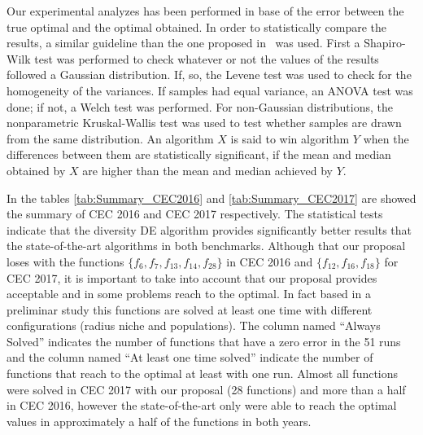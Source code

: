 Our experimental analyzes has been performed in base of the error between the true optimal and the optimal obtained.
%
In order to statistically compare the results, a similar guideline than the one proposed in~\cite{Joel:StatisticalTest} was used. 
%
First a Shapiro-Wilk test was performed to check whatever or not the values of the results followed a Gaussian distribution. 
%
If, so, the Levene test was used to check for the homogeneity of the variances. 
%
If samples had equal variance, an ANOVA test was done; if not, a Welch test was performed. 
%
For non-Gaussian distributions, the nonparametric Kruskal-Wallis test was used to test whether samples are drawn from the same distribution. 
%
An algorithm $X$ is said to win algorithm $Y$ when the differences between them are statistically significant, if the mean and median obtained by $X$ are higher than the mean and median achieved by $Y$.

In the tables \ref{tab:Summary_CEC2016} and \ref{tab:Summary_CEC2017} are showed the summary of CEC 2016 and CEC 2017 respectively.
%
The statistical tests indicate that the diversity DE algorithm provides significantly better results that the state-of-the-art algorithms in both benchmarks.
%
Although that our proposal loses with the functions $\{f_6, f_7, f_{13}, f_{14}, f_{28}\}$ in CEC 2016 and $\{ f_{12}, f_{16}, f_{18} \}$ for CEC 2017, it is important to take into account that our proposal provides acceptable and in some problems reach to the optimal.
%
In fact based in a preliminar study this functions are solved at least one time with different configurations (radius niche and populations).
%
The column named ``Always Solved'' indicates the number of functions that have a zero error in the 51 runs and the column named ``At least one time solved'' indicate the number of functions that reach to the optimal at least with one run.
%
Almost all functions were solved in CEC 2017 with our proposal (28 functions) and more than a half in CEC 2016, however the state-of-the-art only were able to reach the optimal values in approximately a half of the functions in both years.

